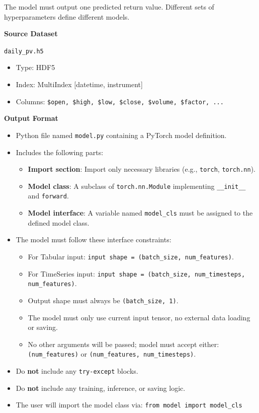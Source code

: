 \documentclass{article}
\begin{document}
\begin{tcolorbox}[
  colback=gray!5, 
  colframe=gray!80,
  title style={fontupper=\bfseries\large},
  title=Specification Prompt – Model-Oriented,
  breakable
]
The model must output one predicted return value. Different sets of hyperparameters define different models.

\vspace{1mm}
\textbf{Source Dataset}

\texttt{daily\_pv.h5}
\begin{itemize}
  \item Type: HDF5
  \item Index: MultiIndex [datetime, instrument]
  \item Columns: \texttt{\$open, \$high, \$low, \$close, \$volume, \$factor, ...}
\end{itemize}

\vspace{1mm}
\textbf{Output Format}
\begin{itemize}
  \item Python file named \texttt{model.py} containing a PyTorch model definition.
  \item Includes the following parts:
    \begin{itemize}
      \item \textbf{Import section}: Import only necessary libraries (e.g., \texttt{torch}, \texttt{torch.nn}).
      \item \textbf{Model class}: A subclass of \texttt{torch.nn.Module} implementing \texttt{\_\_init\_\_} and \texttt{forward}.
      \item \textbf{Model interface}: A variable named \texttt{model\_cls} must be assigned to the defined model class.
    \end{itemize}
  \item The model must follow these interface constraints:
    \begin{itemize}
      \item For Tabular input: \texttt{input shape = (batch\_size, num\_features)}.
      \item For TimeSeries input: \texttt{input shape = (batch\_size, num\_timesteps, num\_features)}.
      \item Output shape must always be \texttt{(batch\_size, 1)}.
      \item The model must only use current input tensor, no external data loading or saving.
      \item No other arguments will be passed; model must accept either:
      \texttt{(num\_features)} or \texttt{(num\_features, num\_timesteps)}.
    \end{itemize}
  \item Do \textbf{not} include any \texttt{try-except} blocks.
  \item Do \textbf{not} include any training, inference, or saving logic.
  \item The user will import the model class via: \texttt{from model import model\_cls}
\end{itemize}


\end{tcolorbox}
\end{document}
